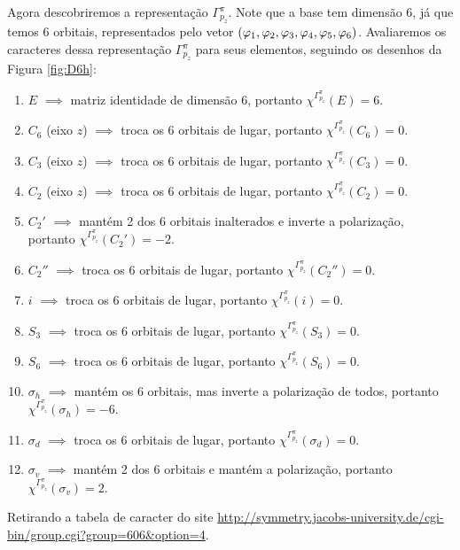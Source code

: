 \documentclass[a4paper,10pt]{article}
\newcommand{\mchi}{\chi^{\Gamma^\pi_{p_z}}}
\begin{document}
Agora descobriremos a representação $\Gamma^\pi_{p_z}$. Note que a base tem dimensão $6$, já que temos 6 orbitais, representados pelo vetor $(\varphi_1, \varphi_2, \varphi_3, \varphi_4, \varphi_5, \varphi_6)$. Avaliaremos os caracteres dessa representação $\Gamma^\pi_{p_z}$ para seus elementos, seguindo os desenhos da Figura \ref{fig:D6h}:
\begin{enumerate}
\item $E$ $\implies$ matriz identidade de dimensão 6, portanto $\mchi(E) = 6$.
\item $C_6$ (eixo $z$) $\implies$ troca os 6 orbitais de lugar, portanto $\mchi(C_6) = 0$.
\item $C_3$ (eixo $z$) $\implies$ troca os 6 orbitais de lugar, portanto $\mchi(C_3) = 0$.
\item $C_2$ (eixo $z$) $\implies$ troca os 6 orbitais de lugar, portanto $\mchi(C_2) = 0$.
\item $C_2'$ $\implies$ mantém 2 dos 6 orbitais inalterados e inverte a polarização, portanto $\mchi(C_2') = -2$.
\item $C_2''$ $\implies$ troca os 6 orbitais de lugar, portanto $\mchi(C_2'') = 0$.
\item $i$ $\implies$ troca os 6 orbitais de lugar, portanto $\mchi(i) = 0$.
\item $S_3$ $\implies$ troca os 6 orbitais de lugar, portanto $\mchi(S_3) = 0$.
\item $S_6$ $\implies$ troca os 6 orbitais de lugar, portanto $\mchi(S_6) = 0$.
\item $\sigma_h$ $\implies$ mantém os 6 orbitais, mas inverte a polarização de todos, portanto $\mchi(\sigma_h) = -6$.
\item $\sigma_d$ $\implies$ troca os 6 orbitais de lugar, portanto $\mchi(\sigma_d) = 0$.
\item $\sigma_v$ $\implies$ mantém 2 dos 6 orbitais e mantém a polarização, portanto $\mchi(\sigma_v) = 2$.
\end{enumerate}

Retirando a tabela de caracter do site \url{http://symmetry.jacobs-university.de/cgi-bin/group.cgi?group=606&option=4}.
\end{document}
